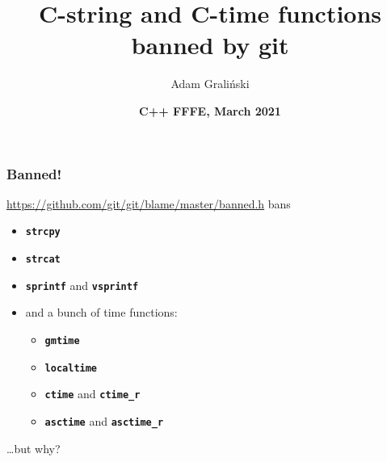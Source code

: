 \documentclass[aspectratio=169]{beamer}
\title[LTN03 :: GitBanned]{C-string and C-time functions banned by git}
\author{Adam Graliński}
\date[FFFE\_21]{\textbf{C++ {\color{red}F}{\color{blue}F}{\color{green}F}{\color{yellow}E}, March 2021}}
\begin{document}
{
\begin{frame}
\titlepage{}
\end{frame}
}

\begin{frame}
\frametitle{Banned!}
{\Large \href{https://github.com/git/git/blame/master/banned.h}
             {https://github.com/git/git/blame/master/banned.h} bans}
\vspace{1ex}
\begin{itemize}
  \item \texttt{\textbf{strcpy}}
  \item \texttt{\textbf{strcat}}
  \item \texttt{\textbf{sprintf}} and \texttt{\textbf{vsprintf}}
  \item and a bunch of time functions:
  \begin{itemize}
    \item \texttt{\textbf{gmtime}}
    \item \texttt{\textbf{localtime}}
    \item \texttt{\textbf{ctime}} and \texttt{\textbf{ctime\_r}}
    \item \texttt{\textbf{asctime}} and \texttt{\textbf{asctime\_r}}
  \end{itemize}
\end{itemize}
\vspace{1ex}
\begin{flushright}\ldots{}but why?\end{flushright}
\end{frame}
\end{document}
